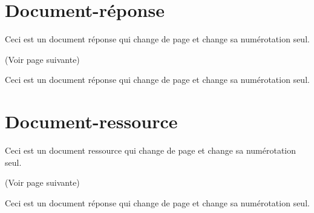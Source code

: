 \documentclass[a4paper,12pt]{article}
\begin{document}
\section{Document-réponse}


\begin{code}%
\begin{docReponse}
Ceci est un document réponse qui change
de page et change sa numérotation seul.
\end{docReponse}
\end{code}
(Voir page suivante)

\begin{docReponse}
Ceci est un document réponse qui change
de page et change sa numérotation seul.
\end{docReponse}


\section{Document-ressource}


\begin{code}%
\begin{docRessource}
Ceci est un document ressource qui
change de page et change sa numérotation seul.
\end{docRessource}
\end{code}
(Voir page suivante)

\begin{docRessource}
Ceci est un document réponse qui
change de page et change sa numérotation seul.
\end{docRessource}
\end{document}
